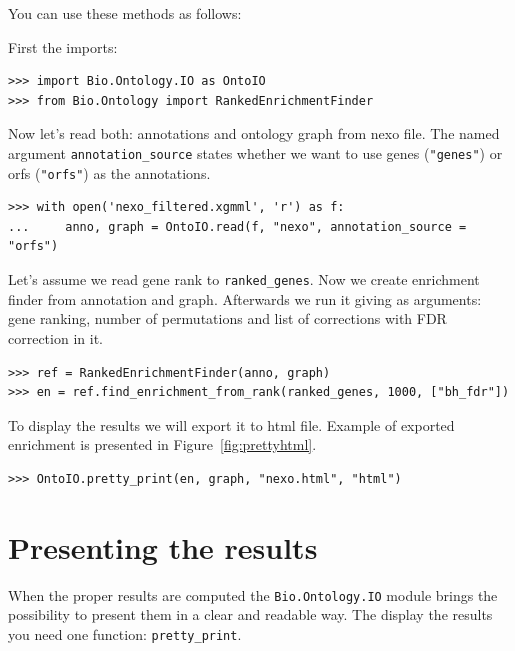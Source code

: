 \documentclass{report}
\begin{document}
You can use these methods as follows:

First the imports:
\begin{verbatim}
>>> import Bio.Ontology.IO as OntoIO
>>> from Bio.Ontology import RankedEnrichmentFinder
\end{verbatim}

Now let's read both: annotations and ontology graph from nexo file. The named
argument \verb|annotation_source| states whether we want to use genes (\verb|"genes"|)
or orfs (\verb|"orfs"|) as the annotations.

\begin{verbatim}
>>> with open('nexo_filtered.xgmml', 'r') as f:
...     anno, graph = OntoIO.read(f, "nexo", annotation_source = "orfs")
\end{verbatim}

Let's assume we read gene rank to \verb|ranked_genes|.
Now we create enrichment finder from annotation and graph. Afterwards we run it
giving as arguments: gene ranking, number of permutations and list of corrections with
FDR correction in it.
\begin{verbatim}
>>> ref = RankedEnrichmentFinder(anno, graph)
>>> en = ref.find_enrichment_from_rank(ranked_genes, 1000, ["bh_fdr"])
\end{verbatim}

To display the results we will export it to html file. Example of exported
enrichment is presented in Figure~\ref{fig:prettyhtml}.
\begin{verbatim}
>>> OntoIO.pretty_print(en, graph, "nexo.html", "html")
\end{verbatim}

\section{Presenting the results}
When the proper results are computed the \verb|Bio.Ontology.IO| module brings
the possibility to present them in a clear and readable way. The display the
results you need one function: \verb|pretty_print|.
\end{document}
